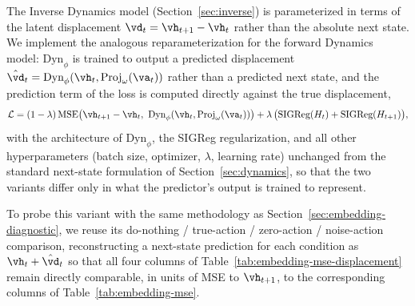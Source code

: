 The Inverse Dynamics model (Section~\ref{sec:inverse}) is parameterized in terms of the latent displacement $\vd_t = \vh_{t+1}-\vh_t$ rather than the absolute next state. We implement the analogous reparameterization for the forward Dynamics model: $\text{Dyn}_\phi$ is trained to output a predicted displacement $\hat{\vd}_t=\text{Dyn}_\phi(\vh_t,\text{Proj}_\omega(\va_t))$ rather than a predicted next state, and the prediction term of the loss is computed directly against the true displacement,
\[
\mathcal{L} = (1-\lambda)\,\text{MSE}\big(\vh_{t+1}-\vh_t,\ \text{Dyn}_\phi(\vh_t,\text{Proj}_\omega(\va_t))\big) + \lambda\,\big(\text{SIGReg}(H_t)+\text{SIGReg}(H_{t+1})\big),
\]
with the architecture of $\text{Dyn}_\phi$, the SIGReg regularization, and all other hyperparameters (batch size, optimizer, $\lambda$, learning rate) unchanged from the standard next-state formulation of Section~\ref{sec:dynamics}, so that the two variants differ only in what the predictor's output is trained to represent.

To probe this variant with the same methodology as Section~\ref{sec:embedding-diagnostic}, we reuse its do-nothing / true-action / zero-action / noise-action comparison, reconstructing a next-state prediction for each condition as $\vh_t+\hat{\vd}_t$ so that all four columns of Table~\ref{tab:embedding-mse-displacement} remain directly comparable, in units of MSE to $\vh_{t+1}$, to the corresponding columns of Table~\ref{tab:embedding-mse}.

\begin{table}[t]
\caption{MSE to $\vh_{t+1}$ (mean / std), for the displacement-conditioned Dynamics variant of this section, on the same do-nothing/true-action/zero-action/noise-action columns as Table~\ref{tab:embedding-mse}. $\hat{\vh}_{t+1}$, zero-action, and noise-action are each reconstructed as $\vh_t+\hat{\vd}_t$ under their respective action input. \emph{n} is the pair count in each group.}
\label{tab:embedding-mse-displacement}
\centering
{}
\end{table}

